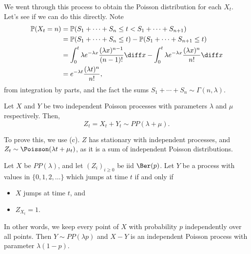 \documentclass[12pt]{article}
\begin{document}
We went through this process to obtain the Poisson distribution for each $X_t$. Let's see if we can do this directly. Note
\begin{align*}
	\mathbb{P}(X_t = n) &= \mathbb{P}(S_1 + \cdots + S_n \leq t < S_1 + \cdots + S_{n+1}) \\
			    &= \mathbb{P}(S_1 + \cdots + S_n \leq t) - \mathbb{P}(S_1 + \cdots + S_{n+1} \leq t) \\
			    &= \int_{0}^{t} \lambda e^{-\lambda x} \frac{(\lambda x)^{n-1}}{(n-1)!} \diff x - \int_{0}^{t} \lambda e^{-\lambda x} \frac{(\lambda x)^{n}}{n!} \diff x \\
			    &= e^{-\lambda t} \frac{(\lambda t)^{n}}{n!},
\end{align*}
from integration by parts, and the fact the sums $S_1 + \cdots + S_n \sim \Gamma(n, \lambda)$.

\begin{theorem}[Superposition]
	Let $X$ and $Y$ be two independent Poisson processes with parameters $\lambda$ and $\mu$ respectively. Then,
	\[
	Z_t = X_t + Y_t \sim PP(\lambda + \mu)
	.\]
\end{theorem}

\begin{proofbox}
	To prove this, we use (c). $Z$ has stationary with independent processes, and $Z_t \sim \Poisson(\lambda t + \mu_t)$, as it is a sum of independent Poisson distributions.
\end{proofbox}

\begin{theorem}[Thinning]
	Let $X$ be $PP(\lambda)$, and let $(Z_i)_{i \geq 0}$ be iid $\Ber(p)$. Let $Y$ be a process with values in $\{0, 1, 2, \ldots\}$ which jumps at time $t$ if and only if
	\begin{itemize}
		\item $X$ jumps at time $t$, and
		\item $Z_{X_t} = 1$.
	\end{itemize}
	In other words, we keep every point of $X$ with probability $p$ independently over all points. Then $Y \sim PP(\lambda p)$ and $X - Y$ is an independent Poisson process with parameter $\lambda(1 - p)$.
\end{theorem}
\end{document}
